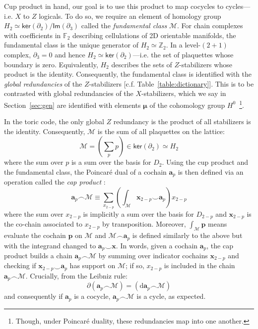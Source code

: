 \documentclass[aps,prx,reprint,superscriptaddress,nofootinbib]{revtex4-2}
\theoremstyle{definition}
\newcommand{\cupp}{\smallsmile}
\newcommand{\capp}{\smallfrown}
\newcommand{\exd}{\text{d}}
\newcommand{\<}{\langle}
\renewcommand{\>}{\rangle}
\begin{document}
Cup product in hand, our goal is to use this product to map cocycles to cycles---i.e. $X$ to $Z$ logicals.
%
To do so, we require an element of homology group $H_2\simeq \mathsf{ker}(\partial_2)/\mathsf{Im}(\partial_3)$ called the \textit{fundamental class} $\mathcal{M}$.
%
For chain complexes with coefficients in $\mathbb{F}_2$ describing cellulations of 2D orientable manifolds, the fundamental class is the unique generator of $H_2 \simeq \mathbb{Z}_2$.
%
In a level-$(2 + 1)$ complex, $\partial_3 = 0$ and hence $H_2 \simeq \mathsf{ker}(\partial_2)$---i.e. the set of plaquettes whose boundary is zero.
%
Equivalently, $H_2$ describes the sets of $Z$-stabilizers whose product is the identity.
%
Consequently, the fundamental class is identified with the \textit{global redundancies} of the $Z$-stabilizers [c.f. Table~\ref{table:dictionary}].
%
This is to be contrasted with global redundancies of the $X$-stabilizers, which we say in Section~\ref{sec:gen} are identified with elements $\boldsymbol{\mu}$ of the cohomology group $H^0$~\footnote{Though, under Poincar\'e duality, these redundancies map into one another.}.



%
In the toric code, the only global $Z$ redundancy is the product of all stabilizers is the identity.
%
Consequently, $\mathcal{M}$ is the sum of all plaquettes on the lattice:
\begin{equation} \label{eq-Mtoriccode}
    \mathcal{M} = \left(\sum_{p} p \right) \in \mathsf{ker}(\partial_2) \simeq H_2
\end{equation}
%
where the sum over $p$ is a sum over the basis for $D_2$.
%
Using the cup product and the fundamental class, the Poincar\'e dual of a cochain $\mathbf{a}_p$ is then defined via an operation called the \textit{cap product} \cite{hatcher2002algebraic}: %
\begin{equation}
    \mathbf{a}_p \capp \mathcal{M} \equiv \sum_{x_{2 - p} } \left( \int_{\mathcal{M}} \mathbf{x}_{2 - p} \cupp \mathbf{a}_p \right) x_{2 -p}
    \label{eq-capproduct}
\end{equation}
where the sum over $x_{2-p}$ is implicitly a sum over the basis for $D_{2 - p}$ and $\mathbf{x}_{2 - p}$ is the co-chain associated to $x_{2 - p}$ by transposition.
%
Moreover, $\int_{\mathcal{M}} \mathbf{p}$ means evaluate the cochain $\mathbf{p}$ on $\mathcal{M}$ and $\mathcal{M} \capp \mathbf{a}_p$ is defined similarly to the above but with the integrand changed to $\mathbf{a}_p \cupp \mathbf{x}$.
%
In words, given a cochain $\mathbf{a}_p$, the cap product builds a chain $\mathbf{a}_p \capp \mathcal{M}$ by summing over indicator cochains $\mathbf{x}_{2 - p}$ and checking if $\mathbf{x}_{2-p} \cupp \mathbf{a}_p$ has support on $\mathcal{M}$; if so, $x_{2 - p}$ is included in the chain $\mathbf{a}_{p} \capp \mathcal{M}$. %
%
Crucially, from the Leibniz rule:
\begin{equation}
 \partial \left(\mathbf{a}_p \capp \mathcal{M}\right) = \left( \exd \mathbf{a}_p \capp \mathcal{M} \right)  
\end{equation}
and consequently if $\mathbf{a}_p$ is a cocycle, $\mathbf{a}_p \capp \mathcal{M}$ is a cycle, as expected.
%
\end{document}
